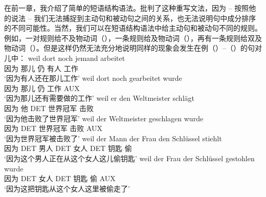 在前一章，我介绍了简单的短语结构语法。\citet[Chapter~5]{Chomsky57a}批判了这种重写文法，因为 -- 按照他的说法 -- 我们无法捕捉到主动句和被动句之间的关系，也无法说明句中成分排序的不同可能性。当然，我们可以在短语结构语法中给主动句和被动句不同的规则。例如，一对规则给不及物动词（），一条规则给及物动词（），再有一条规则给双及物动词（）。但是这样仍然无法充分地说明同样的现象会发生在例（）--（）的句对儿中：
\eal
\label{ex-transformations-intr}
\ex 
\gll weil dort noch jemand arbeitet\\
     因为 那儿 仍 有人 工作\\
\glt `因为有人还在那儿工作'
\ex 
\gll weil dort noch gearbeitet wurde\\
     因为 那儿 仍 工作 AUX\\
\glt `因为那儿还有需要做的工作'	 
\zl
\eal
\ex 
\gll weil er den Weltmeister schlägt\\
	 因为 他 DET 世界冠军 击败\\
\glt `因为他击败了世界冠军'
\ex 
\gll weil der Weltmeister geschlagen wurde\\
	 因为 DET 世界冠军 击败 AUX\\
\glt `因为世界冠军被击败了'
\zl
\eal
\label{ex-transformations-ditr}
\ex 
\gll weil der Mann der Frau den Schlüssel stiehlt\\
	 因为 DET 男人 DET 女人 DET 钥匙 偷\\
\glt `因为这个男人正在从这个女人这儿偷钥匙'
\ex 
\gll weil der Frau der Schlüssel gestohlen wurde\\
	 因为 DET 女人 DET 钥匙 偷 AUX\\
\glt `因为这把钥匙从这个女人这里被偷走了'
\zl

